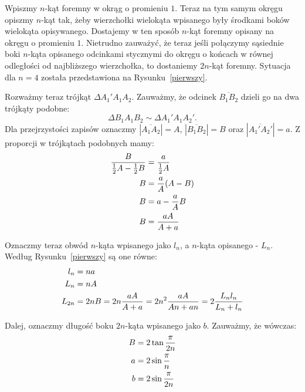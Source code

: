 Wpiszmy $n$-kąt foremny w okrąg o promieniu $1$. Teraz na tym samym okręgu opiszmy $n$-kąt tak, żeby wierzchołki wielokąta wpisanego były środkami boków wielokąta opisywanego. Dostajemy w ten sposób $n$-kąt foremny opisany na okręgu o promieniu $1$. Nietrudno zauważyć, że teraz jeśli połączymy sąsiednie boki $n$-kąta opisanego odcinkami stycznymi do okręgu o końcach w równej odległości od najbliższego wierzchołka, to dostaniemy $2n$-kąt foremny. Sytuacja dla $n=4$ została  przedstawiona na Rysunku~\ref{pierwszy}.

Rozważmy teraz trójkąt $\Delta A_1'A_1A_2$. Zauważmy, że odcinek $\overline{B_1B_2}$ dzieli go na dwa trójkąty podobne:
$$\Delta B_1A_1B_2\sim\Delta A_1'A_1A_2'.$$
Dla przejrzystości zapisów oznaczmy $|\overline{A_1A_2}|=A$, $|\overline{B_1B_2}|=B$ oraz $|\overline{A_1'A_2'}|=a$. Z proporcji w trójkątach podobnych mamy:
\begin{align*}
    {B\over \frac12A-\frac12B}&={a\over \frac 12A}\\
    B&=\frac aA(A-B)\\
    B&=a-\frac aAB\\
    B&={aA\over A+a}
\end{align*}

Oznaczmy teraz obwód $n$-kąta wpisanego jako $l_n$, a $n$-kąta opisanego - $L_n$. Według Rysunku~\ref{pierwszy} są one równe:
\begin{align*}
    l_n&=na\\
    L_n&=nA\\
    L_{2n}&=2nB=2n{aA\over A+a}=2n^2{aA\over An+an}=2{L_nl_n\over L_n+l_n}
\end{align*}

Dalej, oznaczmy długość boku $2n$-kąta wpisanego jako $b$. Zauważmy, że wówczas:
\begin{align*}
    B&=2\tan{\pi\over 2n}\\
    a&=2\sin{\pi\over n}\\
    b&=2\sin{\pi\over 2n}
\end{align*}

